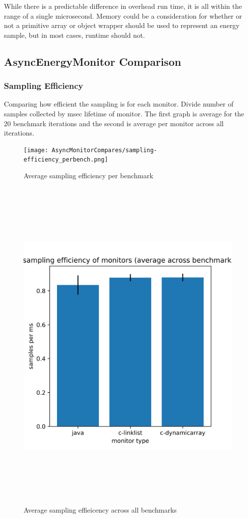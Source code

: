 While there is a predictable difference in overhead run time, it is all within the range of a single microsecond. Memory could be a consideration for whether or not a primitive array or object wrapper should be used to represent an energy sample, but in most cases, runtime should not.

\subsection{AsyncEnergyMonitor Comparison}
\subsubsection{Sampling Efficiency}
Comparing how efficient the sampling is for each monitor. Divide number of samples collected
by msec lifetime of monitor. The first graph is average for the 20 benchmark iterations and
the second is average per monitor across all iterations.

    \begin{figure}[H]
    	\centering
    	\texttt{[image: AsyncMonitorCompares/sampling-efficiency\_perbench.png]}
    	\caption{Average sampling efficiency per benchmark}
    	\label{fig:samplingefficiency_perbench}
    \end{figure}
    \begin{figure}[H]
    	\centering
    	\includegraphics[width=17cm,height=17cm,keepaspectratio]{AsyncMonitorCompares/sampling-efficiency_overall.png}
    	\caption{Average sampling effieicency across all benchmarks}
    	\label{fig:samplingefficiency_overall}
    \end{figure}

